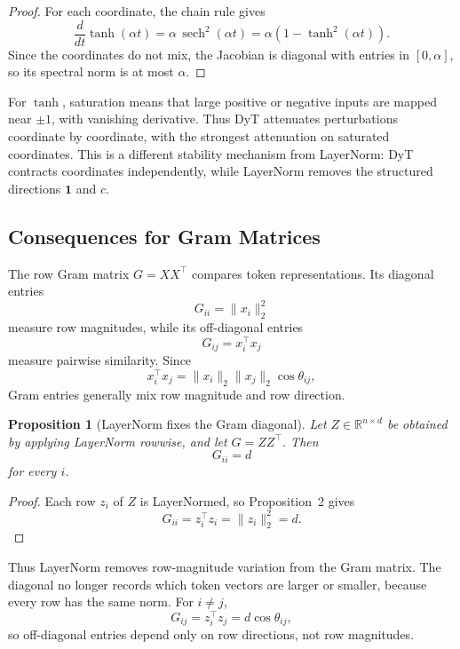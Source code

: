 \documentclass[11pt]{article}
\newtheorem{proposition}{Proposition}
\newcommand{\R}{\mathbb{R}}
\newcommand{\one}{\mathbf{1}}
\newcommand{\sech}{\operatorname{sech}}
\begin{document}
\begin{proof}
For each coordinate, the chain rule gives
\[
    \frac{d}{dt}\tanh(\alpha t)
    =
    \alpha\,\sech^2(\alpha t)
    =
    \alpha(1-\tanh^2(\alpha t)).
\]
Since the coordinates do not mix, the Jacobian is diagonal with entries in \([0,\alpha]\), so its spectral norm is at most \(\alpha\).
\end{proof}

For \(\tanh\), saturation means that large positive or negative inputs are mapped near \(\pm 1\), with vanishing derivative. Thus DyT attenuates perturbations coordinate by coordinate, with the strongest attenuation on saturated coordinates. This is a different stability mechanism from LayerNorm: DyT contracts coordinates independently, while LayerNorm removes the structured directions \(\one\) and \(c\).

\subsection{Consequences for Gram Matrices}

The row Gram matrix \(G=XX^\top\) compares token representations. Its diagonal entries
\[
    G_{ii}=\|x_i\|_2^2
\]
measure row magnitudes, while its off-diagonal entries
\[
    G_{ij}=x_i^\top x_j
\]
measure pairwise similarity. Since
\[
    x_i^\top x_j=\|x_i\|_2\|x_j\|_2\cos\theta_{ij},
\]
Gram entries generally mix row magnitude and row direction.

\begin{proposition}[LayerNorm fixes the Gram diagonal]
Let \(Z\in\R^{n\times d}\) be obtained by applying LayerNorm rowwise, and let \(G=ZZ^\top\). Then
\begin{equation}
    G_{ii}=d
\label{eq:ln-gram-diagonal}
\end{equation}
for every \(i\).
\end{proposition}

\begin{proof}
Each row \(z_i\) of \(Z\) is LayerNormed, so Proposition~2 gives
\[
    G_{ii}=z_i^\top z_i=\|z_i\|_2^2=d.
\]
\end{proof}

Thus LayerNorm removes row-magnitude variation from the Gram matrix. The diagonal no longer records which token vectors are larger or smaller, because every row has the same norm. For \(i\neq j\),
\[
    G_{ij}=z_i^\top z_j=d\cos\theta_{ij},
\]
so off-diagonal entries depend only on row directions, not row magnitudes.
\end{document}
